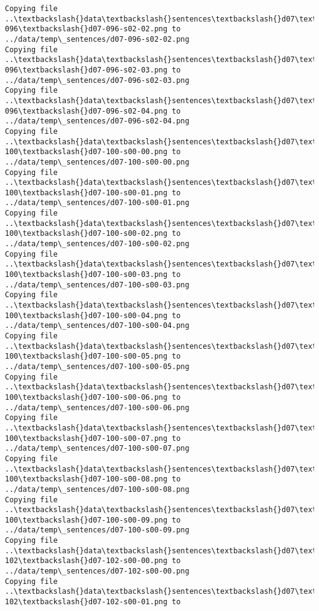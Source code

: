 \documentclass[11pt]{article}
\begin{document}
\begin{Verbatim}[commandchars=\\\{\}]
Copying file ..\textbackslash{}data\textbackslash{}sentences\textbackslash{}d07\textbackslash{}d07-096\textbackslash{}d07-096-s02-02.png to
../data/temp\_sentences/d07-096-s02-02.png
Copying file ..\textbackslash{}data\textbackslash{}sentences\textbackslash{}d07\textbackslash{}d07-096\textbackslash{}d07-096-s02-03.png to
../data/temp\_sentences/d07-096-s02-03.png
Copying file ..\textbackslash{}data\textbackslash{}sentences\textbackslash{}d07\textbackslash{}d07-096\textbackslash{}d07-096-s02-04.png to
../data/temp\_sentences/d07-096-s02-04.png
Copying file ..\textbackslash{}data\textbackslash{}sentences\textbackslash{}d07\textbackslash{}d07-100\textbackslash{}d07-100-s00-00.png to
../data/temp\_sentences/d07-100-s00-00.png
Copying file ..\textbackslash{}data\textbackslash{}sentences\textbackslash{}d07\textbackslash{}d07-100\textbackslash{}d07-100-s00-01.png to
../data/temp\_sentences/d07-100-s00-01.png
Copying file ..\textbackslash{}data\textbackslash{}sentences\textbackslash{}d07\textbackslash{}d07-100\textbackslash{}d07-100-s00-02.png to
../data/temp\_sentences/d07-100-s00-02.png
Copying file ..\textbackslash{}data\textbackslash{}sentences\textbackslash{}d07\textbackslash{}d07-100\textbackslash{}d07-100-s00-03.png to
../data/temp\_sentences/d07-100-s00-03.png
Copying file ..\textbackslash{}data\textbackslash{}sentences\textbackslash{}d07\textbackslash{}d07-100\textbackslash{}d07-100-s00-04.png to
../data/temp\_sentences/d07-100-s00-04.png
Copying file ..\textbackslash{}data\textbackslash{}sentences\textbackslash{}d07\textbackslash{}d07-100\textbackslash{}d07-100-s00-05.png to
../data/temp\_sentences/d07-100-s00-05.png
Copying file ..\textbackslash{}data\textbackslash{}sentences\textbackslash{}d07\textbackslash{}d07-100\textbackslash{}d07-100-s00-06.png to
../data/temp\_sentences/d07-100-s00-06.png
Copying file ..\textbackslash{}data\textbackslash{}sentences\textbackslash{}d07\textbackslash{}d07-100\textbackslash{}d07-100-s00-07.png to
../data/temp\_sentences/d07-100-s00-07.png
Copying file ..\textbackslash{}data\textbackslash{}sentences\textbackslash{}d07\textbackslash{}d07-100\textbackslash{}d07-100-s00-08.png to
../data/temp\_sentences/d07-100-s00-08.png
Copying file ..\textbackslash{}data\textbackslash{}sentences\textbackslash{}d07\textbackslash{}d07-100\textbackslash{}d07-100-s00-09.png to
../data/temp\_sentences/d07-100-s00-09.png
Copying file ..\textbackslash{}data\textbackslash{}sentences\textbackslash{}d07\textbackslash{}d07-102\textbackslash{}d07-102-s00-00.png to
../data/temp\_sentences/d07-102-s00-00.png
Copying file ..\textbackslash{}data\textbackslash{}sentences\textbackslash{}d07\textbackslash{}d07-102\textbackslash{}d07-102-s00-01.png to

\end{Verbatim}
\end{document}
